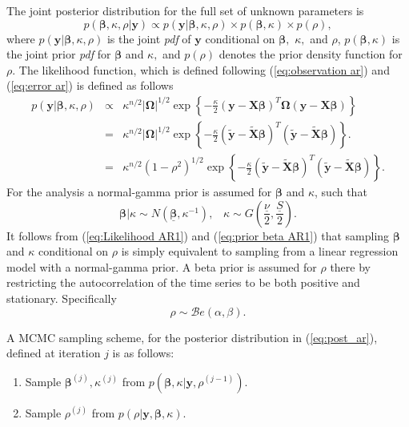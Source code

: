 \documentclass[article]{jss}
\begin{document}
The joint posterior distribution for the full set of unknown parameters
is
\begin{equation} p(\bm{\beta},\kappa,\rho|\bm{y})\propto
  p(\bm{y}|\bm{\beta},\kappa,\rho)\times p(\bm{\beta},\kappa)\times
  p(\rho),\label{eq:post_ar}
\end{equation} where
$p(\bm{y}|\bm{\beta},\kappa,\rho)$ is the joint \emph{pdf} of $\bm{y}$
conditional on $\bm{\beta},$ $\kappa,$ and $\rho$,
$p(\bm{\beta},\kappa)$ is the joint prior \emph{pdf} for $\bm{\beta}$
and $\kappa,$ and $p(\rho)$ denotes the prior density function for
$\rho.$ The likelihood function, which is defined following
(\ref{eq:observation ar}) and (\ref{eq:error ar}) is defined as
follows
\begin{eqnarray}
  p(\bm{y}|\bm{\beta},\kappa,\rho) & \propto & \kappa^{n/2}|\bm{\Omega}|^{1/2}\exp\left\{ -\frac{\kappa}{2}\left(\bm{y}-\bm{X}\bm{\beta}\right)^{T}\bm{\Omega}\left(\bm{y}-\bm{X}\bm{\beta}\right)\right\} \nonumber \\
  & = & \kappa^{n/2}|\bm{\Omega}|^{1/2}\exp\left\{ -\frac{\kappa}{2}\left(\tilde{\bm{y}}-\tilde{\bm{X}}\bm{\beta}\right)^{T}\left(\tilde{\bm{y}}-\tilde{\bm{X}}\bm{\beta}\right)\right\} .\nonumber \\
  & = & \kappa^{n/2}\left(1-\rho^{2}\right)^{1/2}\exp\left\{
    -\frac{\kappa}{2}\left(\tilde{\bm{y}}-\tilde{\bm{X}}\bm{\beta}\right)^{T}\left(\tilde{\bm{y}}-\tilde{\bm{X}}\bm{\beta}\right)\right\}
  .
  \label{eq:Likelihood AR1}
\end{eqnarray} 
For the analysis a normal-gamma prior is assumed for $\bm{\beta}$ and
$\kappa$, such that
\begin{equation} \bm{\beta}|\kappa\sim
  N\left(\underline{\bm{\beta}},\kappa^{-1}\right),\,\,\,\,\,\kappa\sim
  G\left(\frac{\underline{\nu}}{2},\frac{\underline{S}}{2}\right).
  \label{eq:prior
    beta AR1}
\end{equation} It follows from (\ref{eq:Likelihood AR1})
and (\ref{eq:prior beta AR1}) that sampling $\bm{\beta}$ and $\kappa$
conditional on $\rho$ is simply equivalent to sampling from a linear
regression model with a normal-gamma prior. A beta prior is assumed
for $\rho$ there by restricting the autocorrelation of the time series
to be both positive and stationary. Specifically\[
\rho\sim\mathcal{B}e\left(\alpha,\beta\right).\]

A MCMC sampling scheme, for the posterior distribution in
(\ref{eq:post_ar}), defined at iteration $j$ is as follows:
\begin{enumerate}
\item Sample $\bm{\beta}^{(j)},\kappa^{(j)}$ from
  $p(\bm{\beta},\kappa|\bm{y},\rho^{(j-1)}).$
\item Sample $\rho^{(j)}$ from $p(\rho|\bm{y},\bm{\beta},\kappa).$
\end{enumerate}
\end{document}
